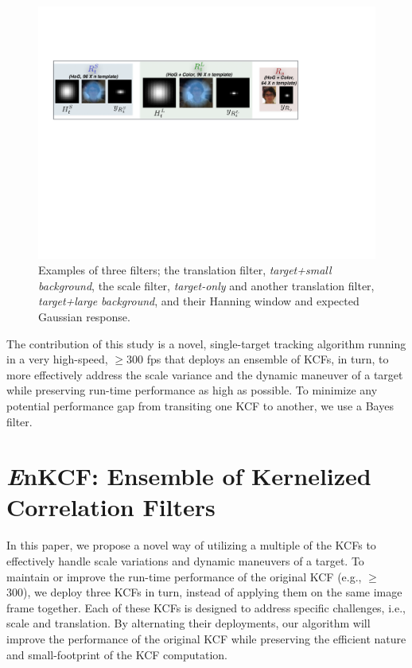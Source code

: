 \documentclass{bmvc2k}
\begin{document}
\begin{figure}[!h]
\centering
\includegraphics[width=1.0\textwidth]{figures/Filters_Details.pdf}
\caption{Examples of three filters; the translation filter,
  \textit{target+small background}, the scale filter,
  \textit{target-only} and another translation filter,
  \textit{target+large background}, and their Hanning window and
  expected Gaussian response.}
\label{fig:Filters}
\end{figure}
The contribution of this study is a novel, single-target tracking
algorithm running in a very high-speed, $\geq 300$ fps that deploys an
ensemble of KCFs, in turn, to more effectively address the scale
variance and the dynamic maneuver of a target while preserving
run-time performance as high as possible. To minimize any potential
performance gap from transiting one KCF to another, we use a Bayes
filter.

\section{{\it E}nKCF: Ensemble of Kernelized Correlation Filters}
In this paper, we propose a novel way of utilizing a multiple of the
KCFs \cite{henriques2015high} to effectively handle scale variations
and dynamic maneuvers of a target. To maintain or improve the run-time
performance of the original KCF (e.g., $\ge$ 300), we deploy three
KCFs in turn, instead of applying them on the same image frame
together. Each of these KCFs is designed to address specific
challenges, i.e., scale and translation. By alternating their
deployments, our algorithm will improve the performance of the
original KCF while preserving the efficient nature and small-footprint
of the KCF computation.
\end{document}
